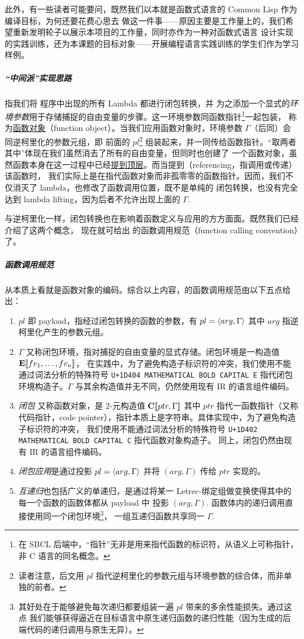 \documentclass[a4paper, 11pt]{article}
\theoremstyle{remark}\newtheorem*{remark}{Remark}
\theoremstyle{definition}\newtheorem*{definition}{Definition}
\begin{document}
此外，有一些读者可能要问，既然我们以本就是函数式语言的 Common Lisp 作为编译目标，为何还要花费心思去
做这一件事——原因主要是工作量上的，我们希望重新发明轮子以展示本项目的工作量，同时亦作为一种对函数式语言
设计实现的实践训练，还为本课题的目标对象——开展编程语言实践训练的学生们作为学习样例。

\subparagraph{“中间派”实现思路} 指我们将 \Tigris 程序中出现的所有 Lambda 都进行闭包转换，并
为之添加一个显式的\emph{环境参数}用于存储捕捉的自由变量的步骤。这一环境参数同函数指针\footnote{
  在 SBCL 后端中，“指针”无非是用来指代函数的标识符，从语义上可称指针，非 C 语言的同名概念。
}一起包装，
称为\underline{函数对象}（function object）。当我们应用函数对象时，环境参数 $\Gamma$（后同）会同逆柯里化的参数元组，即
前面的 $pl$\footnote{
  读者注意，后文用 $pl$ 指代逆柯里化的参数元组与环境参数的综合体，而非单独的前者。
}
组装起来，并一同传给函数指针。“取两者其中”体现在我们虽然消去了所有的自由变量，但同时也创建了
一个函数对象，虽然函数本身在这一过程中已经\underline{提到顶层}。而当提到（referencing，指调用或传递）该函数时，
我们实际上是在指代函数对象而非孤零零的函数指针。因而，我们不仅消灭了 lambda，也修改了函数调用位置，既不是单纯的
闭包转换，也没有完全达到 lambda lifting，因为后者不允许出现上面的 $\Gamma$.

与逆柯里化一样，闭包转换也在影响着函数定义与应用的方方面面。既然我们已经介绍了这两个概念，
现在就可给出 \Tigris 的函数调用规范（function calling convention）了。

\subparagraph{函数调用规范}\label{fn:calling-conv}从本质上看就是函数对象的编码。综合以上内容，\Tigris 的函数调用规范由以下五点给出：
\begin{enumerate}
  \item $pl$ 即 payload，指经过闭包转换的函数的参数，有 $pl=\langle arg, \Gamma \rangle$ 其中
    $arg$ 指逆柯里化产生的参数元组。
  \item $\Gamma$ 又称闭包环境，指对捕捉的自由变量的显式存储。闭包环境是一构造值 $\mathbf{E}\llbracket fv_1,\dots,fv_n \rrbracket$，
    在实践中，为了避免构造子标识符的冲突，我们使用不能通过词法分析的特殊符号 \texttt{U+1D404 MATHEMATICAL BOLD CAPITAL E}
    指代闭包环境构造子。$\Gamma$ 与其余构造值并无不同，仍然使用现有 IR 的语言组件编码。
  \item \emph{闭包} 又称函数对象，是 2-元构造值 $\mathbf{C}\llbracket ptr, \Gamma \rrbracket$ 其中 $ptr$
    指代一函数指针（又称代码指针，code pointer），指针本质上是字符串。具体实现中，为了避免构造子标识符的冲突，
    我们使用不能通过词法分析的特殊符号 \texttt{U+1D402 MATHEMATICAL BOLD CAPITAL C} 指代函数对象构造子。
    同上，闭包仍然由现有 IR 的语言组件编码。
  \item \emph{闭包应用}是通过投影 $pl=\langle arg, \Gamma \rangle$ 并将 $(arg, \Gamma)$ 传给 $ptr$ 实现的。
  \item \emph{互递归}也包括广义的单递归，是通过将某一 Letrec-绑定组做变换使得其中的每一个函数的函数体都从 payload 中
    投影 $(arg, \Gamma)$. 函数体内的递归调用直接使用同一个闭包环境\footnote{
      其好处在于能够避免每次递归都要组装一遍 $pl$ 带来的多余性能损失。通过这点
      我们能够获得逼近在目标语言中原生递归函数的递归性能（因为生成的后端代码的递归调用与原生无异）。
    }，
    一组互递归函数共享同一 $\Gamma$.
\end{enumerate}
\end{document}
